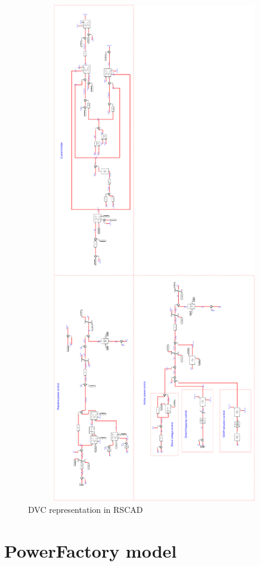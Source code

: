 \begin{figure}[H]
\centering
    \includegraphics[height = 22cm,width = 12.5cm]{Diagrams/Appendix_A/GSC_Control_RSCAD_2.pdf}
    \caption{DVC representation in RSCAD}
    \label{fig:GSC_Control_RSCAD_2}
\end{figure}

\section{PowerFactory model}

